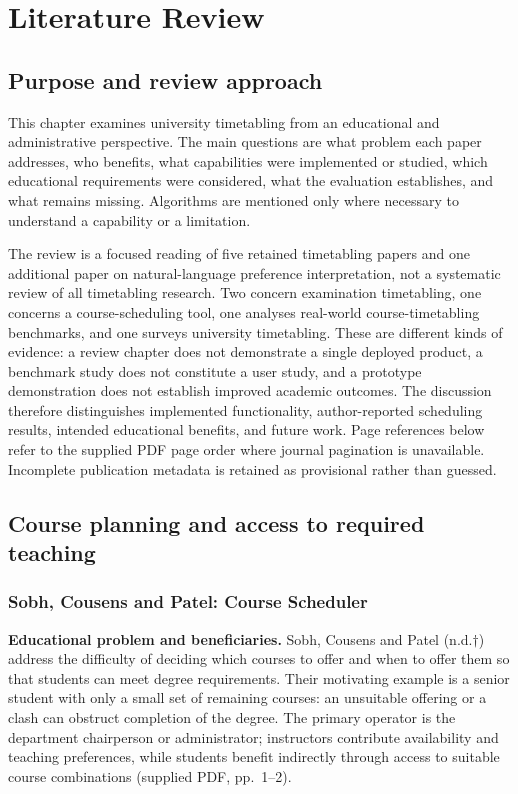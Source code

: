 \documentclass[
  11pt,a4paper,oneside]{report}
\begin{document}
\chapter{Literature Review}\label{literature-review}

\section{Purpose and review approach}
This chapter examines university timetabling from an educational and administrative perspective. The main questions are what problem each paper addresses, who benefits, what capabilities were implemented or studied, which educational requirements were considered, what the evaluation establishes, and what remains missing. Algorithms are mentioned only where necessary to understand a capability or a limitation.

The review is a focused reading of five retained timetabling papers and one additional paper on natural-language preference interpretation, not a systematic review of all timetabling research. Two concern examination timetabling, one concerns a course-scheduling tool, one analyses real-world course-timetabling benchmarks, and one surveys university timetabling. These are different kinds of evidence: a review chapter does not demonstrate a single deployed product, a benchmark study does not constitute a user study, and a prototype demonstration does not establish improved academic outcomes. The discussion therefore distinguishes implemented functionality, author-reported scheduling results, intended educational benefits, and future work. Page references below refer to the supplied PDF page order where journal pagination is unavailable. Incomplete publication metadata is retained as provisional rather than guessed.

\section{Course planning and access to required teaching}
\subsection{Sobh, Cousens and Patel: Course Scheduler}
\textbf{Educational problem and beneficiaries.} Sobh, Cousens and Patel (n.d.$\dagger$) address the difficulty of deciding which courses to offer and when to offer them so that students can meet degree requirements. Their motivating example is a senior student with only a small set of remaining courses: an unsuitable offering or a clash can obstruct completion of the degree. The primary operator is the department chairperson or administrator; instructors contribute availability and teaching preferences, while students benefit indirectly through access to suitable course combinations (supplied PDF, pp.~1--2).
\end{document}
